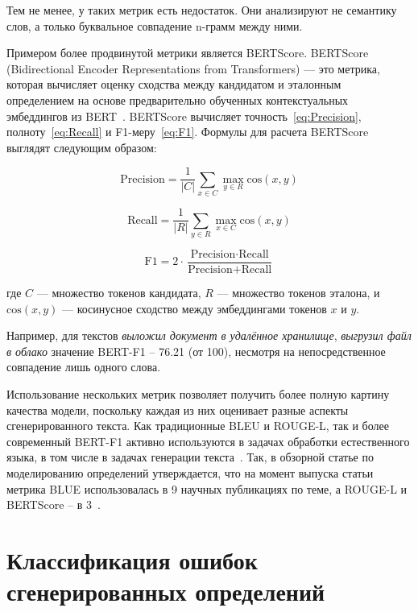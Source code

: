 \documentclass[LI,VKR]{HSEUniversity}
\begin{document}
Тем не менее, у таких метрик есть недостаток.
Они анализируют не семантику слов, а только буквальное совпадение n-грамм между ними.

Примером более продвинутой метрики является BERTScore.
BERTScore (Bidirectional Encoder Representations from Transformers) — это метрика,
которая вычисляет оценку сходства между кандидатом и эталонным определением
на основе предварительно обученных контекстуальных эмбеддингов из BERT~\cite{BERTScore}.
BERTScore вычисляет точность~\eqref{eq:Precision}, полноту~\eqref{eq:Recall} и F1-меру~\eqref{eq:F1}.
Формулы для расчета BERTScore выглядят следующим образом:

\begin{equation}
\text{Precision} = \frac{1}{|C|} \sum_{x \in C} \max_{y \in R} \text{cos}(x, y)\label{eq:Precision}
\end{equation}

\begin{equation}
\text{Recall} = \frac{1}{|R|} \sum_{y \in R} \max_{x \in C} \text{cos}(x, y)\label{eq:Recall}
\end{equation}

\begin{equation}
\text{F1} = 2 \cdot \frac{\text{Precision} \cdot \text{Recall}}{\text{Precision} + \text{Recall}}\label{eq:F1}
\end{equation}

где $C$ — множество токенов кандидата, $R$ — множество токенов эталона,
и $\text{cos}(x, y)$ — косинусное сходство между эмбеддингами токенов $x$ и $y$.

Например, для текстов \textit{выложил документ в удалённое хранилище}, \textit{выгрузил файл в облако}
значение BERT-F1 – 76.21 (от 100), несмотря на непосредственное совпадение лишь одного слова.

Использование нескольких метрик позволяет получить более полную картину качества модели,
поскольку каждая из них оценивает разные аспекты сгенерированного текста.
Как традиционные BLEU и ROUGE-L, так и более современный BERT-F1 активно используются в
задачах обработки естественного языка, в том числе в задачах генерации текста~\cite{BLUE,ROUGE,BERTScore}.
Так, в обзорной статье по моделированию определений утверждается, что на момент выпуска статьи метрика BLUE
использовалась в 9 научных публикациях по теме, а ROUGE-L и BERTScore – в 3~\cite{DefinitionModelingReviewAndDatasetAnalysis}.

\section{Классификация ошибок сгенерированных определений}
\end{document}
